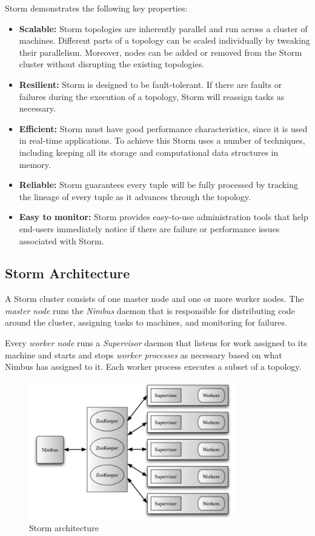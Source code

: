 Storm demonstrates the following key properties:
\begin{itemize}
\item \textbf{Scalable:} Storm topologies are inherently parallel and run across a cluster of machines. Different parts of a topology can be scaled individually by tweaking their parallelism. Moreover, nodes can be added or removed from the Storm cluster without disrupting the existing topologies.
\item \textbf{Resilient:} Storm is designed to be fault-tolerant. If there are faults or failures during the execution of a topology, Storm will reassign tasks as necessary.
\item \textbf{Efficient:} Storm must have good performance characteristics, since it is used in real-time applications. To achieve this Storm uses a number of techniques, including keeping all its storage and computational data structures in memory.
\item \textbf{Reliable:} Storm guarantees every tuple will be fully processed by tracking the lineage of every tuple as it advances through the topology.
\item \textbf{Easy to monitor:} Storm provides easy-to-use administration tools that help end-users immediately notice if there are failure or performance issues associated with Storm.
\end{itemize}

\subsection{Storm Architecture}

A Storm cluster consists of one master node and one or more worker nodes. The \emph{master node} runs the \emph{Nimbus} daemon that is responsible for distributing code around the cluster, assigning tasks to machines, and monitoring for failures.

Every \emph{worker node} runs a \emph{Supervisor} daemon that listens for work assigned to its machine and starts and stops \emph{worker processes} as necessary based on what Nimbus has assigned to it. Each worker process executes a subset of a topology.

\begin{figure}[H]
\centering
\includegraphics[width=0.8\textwidth]{figures/storm_cluster}
\caption{Storm architecture}
\label{figure:storm_cluster}
\end{figure}

